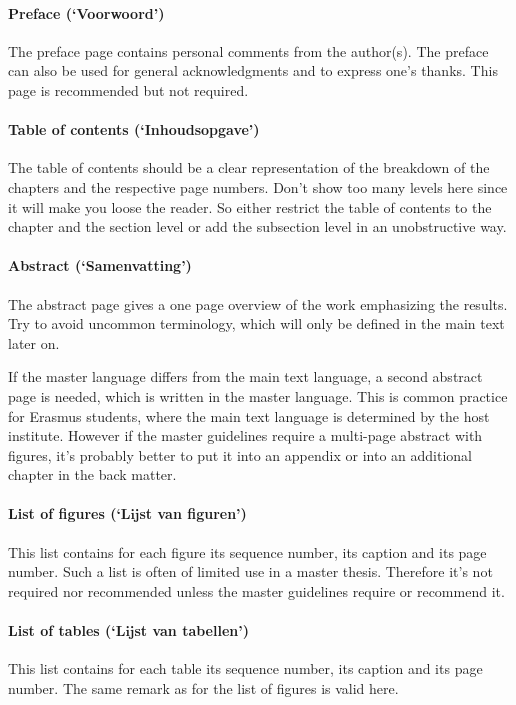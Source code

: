 \documentclass[11pt,article,oneside,a4paper]{memoir}
\newcommand\Dutch[1]{`\foreignlanguage{dutch}{#1}'}
\begin{document}
\paragraph{Preface (\Dutch{Voorwoord})} The preface page contains personal
comments from the author(s). The preface can also be used for general
acknowledgments and to express one's thanks. This page is recommended but
not required.

\paragraph{Table of contents (\Dutch{Inhoudsopgave})} The table of contents
should be a clear representation of the breakdown of the chapters and the
respective page numbers. Don't show too many levels here since it will make
you loose the reader. So either restrict the table of contents to the
chapter and the section level or add the subsection level in an
unobstructive way.

\paragraph{Abstract (\Dutch{Samenvatting})} The abstract page gives a one
page overview of the work emphasizing the results. Try to avoid uncommon
terminology, which will only be defined in the main text later on.

If the master language differs from the main text language, a second
abstract page is needed, which is written in the master language. This is
common practice for Erasmus students, where the main text language is
determined by the host institute. However if the master guidelines require
a multi-page abstract with figures, it's probably better to put it into an
appendix or into an additional chapter in the back matter.

\paragraph{List of figures (\Dutch{Lijst van figuren})} This list contains for each
figure its sequence number, its caption and its page number. Such a list is
often of limited use in a master thesis. Therefore it's not required
nor recommended unless the master guidelines require or recommend it.

\paragraph{List of tables (\Dutch{Lijst van tabellen})} This list contains for each
table its sequence number, its caption and its page number. The same remark
as for the list of figures is valid here.
\end{document}
